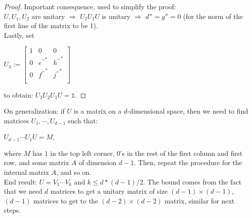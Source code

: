{\begin{proof}
Important consequence, used to simplify the proof: \\
$U, U_1, U_2$ are unitary $\Rightarrow$ $U_2U_1U$ is unitary $\Rightarrow$ $d'' = g'' = 0$ (for the norm of the first line of the matrix to be 1).\\

Lastly, set 
\begin{center}
$U_3 := 
\begin{bmatrix}
    1 & 0 & 0  \\
    0 & {e^{\prime\prime}}^* & {h^{\prime\prime}}^*  \\
    0 & {f^{\prime\prime}}^* & {j^{\prime\prime}}^*  \\
\end{bmatrix}$
\end{center}
to obtain: 
    $U_3U_2U_1U= \mathds{1}$.     
\end{proof}

On generalization: if $U$ is a matrix on a $d$-dimensional space, then we need to find matrices $U_1, \cdots, U_{d-1}$ such that: \\
\begin{center}
    $U_{d-1} \cdots U_1U = M $,
\end{center}
where $M$ has $1$ in the top left corner, $0$'s in the rest of the first column and first row, and some matrix $A$ of dimension $d-1$.
Then, repeat the procedure for the internal matrix $A$, and so on. \\

End result: $U=V_1 \cdots V_k$ and $k \leq d*(d-1)/2$. The bound comes from the fact that we need $d$ matrices to get a unitary matrix of size $(d-1) \times (d-1)$, $(d-1)$ matrices to get to the $(d-2) \times (d-2)$ matrix, similar for next steps.
}
